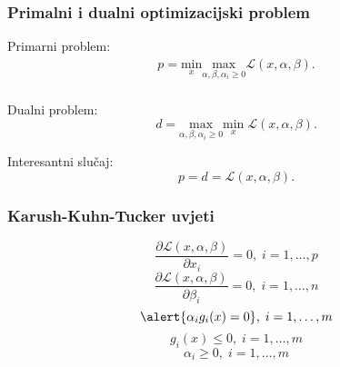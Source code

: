 \documentclass[utf8]{beamer}
\begin{document}
\begin{frame}
\frametitle{Primalni i dualni optimizacijski problem}
Primarni problem:
\begin{equation*}
\begin{aligned}
p = \underset{x}{\text{min}}
\underset{\alpha, \beta, \alpha_i \geq 0}{\text{max}}
\mathcal{L}(x, \alpha, \beta).\\
\end{aligned}
\end{equation*}

Dualni problem:
\begin{equation*}
d = 
\underset{\alpha, \beta, \alpha_i \geq 0}{\text{max}} \underset{x}{\text{min}} \; \mathcal{L}(x, \alpha, \beta).
\end{equation*}

Interesantni slučaj:
\begin{equation*}
  p = d = \mathcal{L}(x, \alpha, \beta).
\end{equation*}
\end{frame}

\begin{frame}
\frametitle{Karush-Kuhn-Tucker uvjeti}
\begin{equation*}
  \frac{\partial \mathcal{L}(x, \alpha, \beta)}{\partial x_i} = 0, \; i = 1, \ldots, p
\end{equation*}
\begin{equation*}
  \frac{\partial \mathcal{L}(x, \alpha, \beta)}{\partial \beta_i} = 0, \; i = 1, \ldots, n
\end{equation*}
\begin{equation*}
  \alert{\alpha_ig_i(x) = 0}, \; i = 1, \ldots, m
\end{equation*}
\begin{equation*}
  g_i(x) \leq 0, \; i = 1, \ldots, m
\end{equation*}
\begin{equation*}
  \alpha_i \geq 0, \; i = 1, \ldots, m
\end{equation*}
\end{frame}
\end{document}
